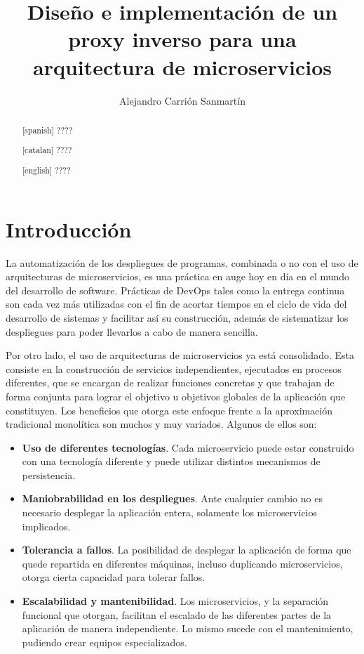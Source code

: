 \documentclass[11pt,spanish,listoffigures]{tfgetsinf}
\title{Diseño e implementación de un proxy inverso para una arquitectura de microservicios}
\author{Alejandro Carrión Sanmartín}
\begin{document}

\begin{abstract}[spanish]
????
\end{abstract}
\begin{abstract}[catalan]
????
\end{abstract}
\begin{abstract}[english]
????
\end{abstract}

\mainmatter


\chapter{Introducción}

La automatización de los despliegues de programas, combinada o no con el uso de arquitecturas de microservicios, es una práctica en auge hoy en día en el mundo del desarrollo de software. Prácticas de DevOps tales como la entrega continua son cada vez más utilizadas con el fin de acortar tiempos en el ciclo de vida del desarrollo de sistemas y facilitar así su construcción, además de sistematizar los despliegues para poder llevarlos a cabo de manera sencilla.

Por otro lado, el uso de arquitecturas de microservicios ya está consolidado. Esta consiste en la construcción de servicios independientes, ejecutados en procesos diferentes, que se encargan de realizar funciones concretas y que trabajan de forma conjunta para lograr el objetivo u objetivos globales de la aplicación que constituyen. Los beneficios que otorga este enfoque frente a la aproximación tradicional monolítica son muchos y muy variados. Algunos de ellos son:

\begin{itemize}

	\item \textbf{Uso de diferentes tecnologías}. Cada microservicio puede estar construido con una tecnología diferente y puede utilizar distintos mecanismos de persistencia.

	\item \textbf{Maniobrabilidad en los despliegues}. Ante cualquier cambio no es necesario desplegar la aplicación entera, solamente los microservicios implicados.

	\item \textbf{Tolerancia a fallos}. La posibilidad de desplegar la aplicación de forma que quede repartida en diferentes máquinas, incluso duplicando microservicios, otorga cierta capacidad para tolerar fallos.

	\item \textbf{Escalabilidad y mantenibilidad}. Los microservicios, y la separación funcional que otorgan, facilitan el escalado de las diferentes partes de la aplicación de manera independiente. Lo mismo sucede con el mantenimiento, pudiendo crear equipos especializados.

\end{itemize}
\end{document}
